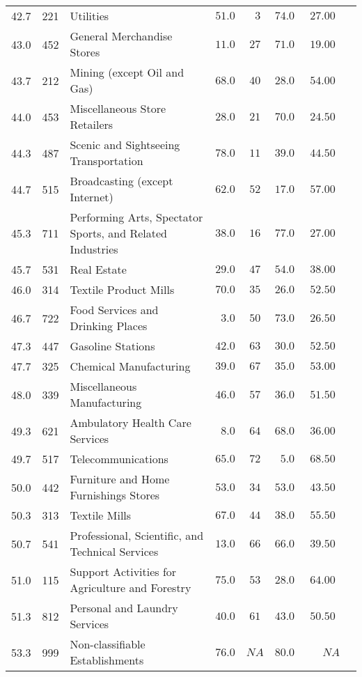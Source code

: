 \documentclass[9pt, oneside]{article}   	%
\begin{document}
\begin{longtable}{lcp{3 in}ccccc}
42.7  & 221 & Utilities & $51.0$ & $\phantom{0}3$ & $74.0$ & $27.00$ \\
43.0  & 452 & General Merchandise Stores & $11.0$ & $27$ & $71.0$ & $19.00$ \\
43.7  & 212 & Mining (except Oil and Gas) & $68.0$ & $40$ & $28.0$ & $54.00$ \\
44.0  & 453 & Miscellaneous Store Retailers & $28.0$ & $21$ & $70.0$ & $24.50$ \\
44.3  & 487 & Scenic and Sightseeing Transportation & $78.0$ & $11$ & $39.0$ & $44.50$ \\
44.7  & 515 & Broadcasting (except Internet) & $62.0$ & $52$ & $17.0$ & $57.00$ \\
45.3  & 711 & Performing Arts, Spectator Sports, and Related Industries & $38.0$ & $16$ & $77.0$ & $27.00$ \\
45.7  & 531 & Real Estate & $29.0$ & $47$ & $54.0$ & $38.00$ \\
46.0  & 314 & Textile Product Mills & $70.0$ & $35$ & $26.0$ & $52.50$ \\
46.7  & 722 & Food Services and Drinking Places & $\phantom{0}3.0$ & $50$ & $73.0$ & $26.50$ \\
47.3  & 447 & Gasoline Stations & $42.0$ & $63$ & $30.0$ & $52.50$ \\
47.7  & 325 & Chemical Manufacturing & $39.0$ & $67$ & $35.0$ & $53.00$ \\
48.0  & 339 & Miscellaneous Manufacturing & $46.0$ & $57$ & $36.0$ & $51.50$ \\
49.3  & 621 & Ambulatory Health Care Services & $\phantom{0}8.0$ & $64$ & $68.0$ & $36.00$ \\
49.7  & 517 & Telecommunications & $65.0$ & $72$ & $\phantom{0}5.0$ & $68.50$ \\
50.0  & 442 & Furniture and Home Furnishings Stores & $53.0$ & $34$ & $53.0$ & $43.50$ \\
50.3  & 313 & Textile Mills & $67.0$ & $44$ & $38.0$ & $55.50$ \\
50.7  & 541 & Professional, Scientific, and Technical Services & $13.0$ & $66$ & $66.0$ & $39.50$ \\
51.0  & 115 & Support Activities for Agriculture and Forestry & $75.0$ & $53$ & $28.0$ & $64.00$ \\
51.3  & 812 & Personal and Laundry Services & $40.0$ & $61$ & $43.0$ & $50.50$ \\
53.3  & 999 & Non-classifiable Establishments & $76.0$ & $NA$ & $80.0$ & $\phantom{000}NA$ \\

\end{longtable}
\end{document}
